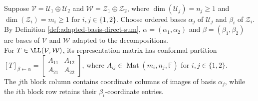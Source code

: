 \begin{definition} \label{def:adapted-block-matrix-of-linear-map} \\
Suppose $\mathcal{V}=\mathcal{U}_1\oplus\mathcal{U}_2$ and $\mathcal{W}=\mathcal{Z}_1\oplus\mathcal{Z}_2$, where $\dim(\mathcal{U}_j)=n_j\geq1$ and $\dim(\mathcal{Z}_i)=m_i\geq1$ for $i,j\in\{1,2\}$. Choose ordered bases $\alpha_j$ of $\mathcal{U}_j$ and $\beta_i$ of $\mathcal{Z}_i$. By Definition \ref{def:adapted-basis-direct-sum}, $\alpha=(\alpha_1,\alpha_2)$ and $\beta=(\beta_1,\beta_2)$ are bases of $\mathcal{V}$ and $\mathcal{W}$ adapted to the decompositions.\\
For $T\in\LL(\mathcal{V},\mathcal{W})$, its representation matrix has conformal partition $[T]_{\beta\leftarrow\alpha}=\left[\begin{smallmatrix}A_{11}&A_{12}\\A_{21}&A_{22}\end{smallmatrix}\right]$, where $A_{ij}\in\operatorname{Mat}(m_i,n_j,\mathbb{F})$ for $i,j\in\{1,2\}$.\\
The $j$th block column contains coordinate columns of images of basis $\alpha_j$, while the $i$th block row retains their $\beta_i$-coordinate entries.
\end{definition}

